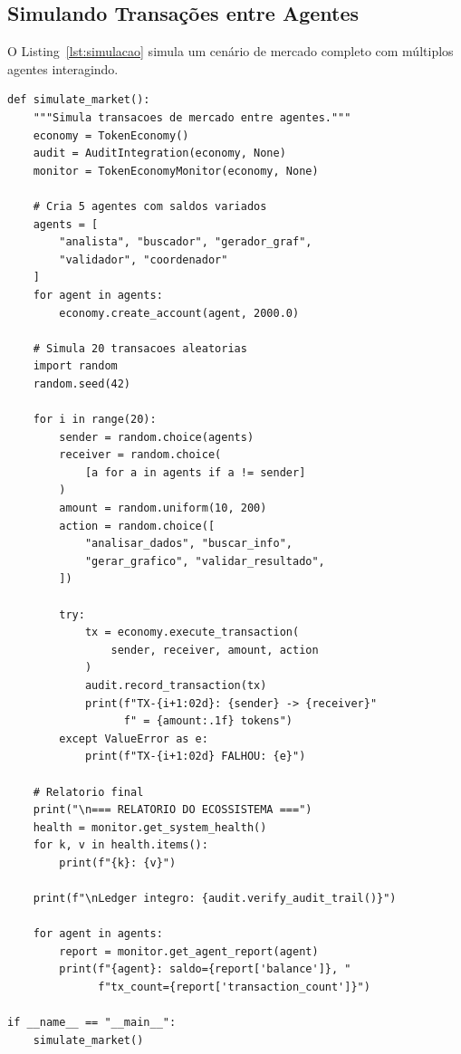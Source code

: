 \subsection{Simulando Transações entre Agentes}

O Listing~\ref{lst:simulacao} simula um cenário de mercado
completo com múltiplos agentes interagindo.

\begin{lstlisting}[caption={Simulacao de mercado entre agentes},
                  label={lst:simulacao}]
def simulate_market():
    """Simula transacoes de mercado entre agentes."""
    economy = TokenEconomy()
    audit = AuditIntegration(economy, None)
    monitor = TokenEconomyMonitor(economy, None)

    # Cria 5 agentes com saldos variados
    agents = [
        "analista", "buscador", "gerador_graf",
        "validador", "coordenador"
    ]
    for agent in agents:
        economy.create_account(agent, 2000.0)

    # Simula 20 transacoes aleatorias
    import random
    random.seed(42)

    for i in range(20):
        sender = random.choice(agents)
        receiver = random.choice(
            [a for a in agents if a != sender]
        )
        amount = random.uniform(10, 200)
        action = random.choice([
            "analisar_dados", "buscar_info",
            "gerar_grafico", "validar_resultado",
        ])

        try:
            tx = economy.execute_transaction(
                sender, receiver, amount, action
            )
            audit.record_transaction(tx)
            print(f"TX-{i+1:02d}: {sender} -> {receiver}"
                  f" = {amount:.1f} tokens")
        except ValueError as e:
            print(f"TX-{i+1:02d} FALHOU: {e}")

    # Relatorio final
    print("\n=== RELATORIO DO ECOSSISTEMA ===")
    health = monitor.get_system_health()
    for k, v in health.items():
        print(f"{k}: {v}")

    print(f"\nLedger integro: {audit.verify_audit_trail()}")

    for agent in agents:
        report = monitor.get_agent_report(agent)
        print(f"{agent}: saldo={report['balance']}, "
              f"tx_count={report['transaction_count']}")

if __name__ == "__main__":
    simulate_market()
\end{lstlisting}

